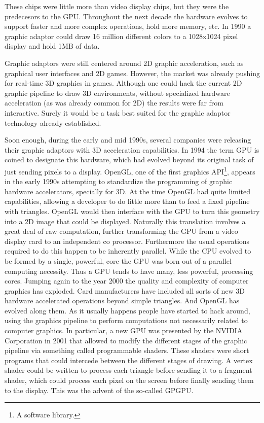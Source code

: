 \documentclass[ twoside,openright,titlepage,numbers=noenddot,%
headinclude,footinclude,cleardoublepage=empty,abstract=on,
BCOR=5mm,paper=a4,fontsize=11pt
]{scrreprt}
\newcommand{\gpu}{\gls{GPU}\xspace}
\begin{document}
These chips were little more than video display chips, but they were the predecesors to the \gpu.
Throughout the next decade the hardware evolves to support faster and more complex operations, hold more memory, etc. In 1990 a graphic adaptor could draw 16 million different colors to a 1028x1024 pixel display and hold 1MB of data.

Graphic adaptors were still centered around 2D graphic acceleration, such as graphical user interfaces and 2D games. However, the market was already pushing for real-time 3D graphics in games. Although one could hack the current 2D graphic pipeline to draw 3D environments, without specialized hardware acceleration (as was already common for 2D) the results were far from interactive. Surely it would be a task best suited for the graphic adaptor technology already established.

Soon enough, during the early and mid 1990s, several companies were releasing their graphic adaptors with 3D acceleration capabilities. In 1994 the term \gpu is coined to designate this hardware, which had evolved beyond its original task of just sending pixels to a display.
OpenGL\cite{opengl}, one of the first graphics \gls{API}\footnote{A software library.}, appears in the early 1990s attempting to standardize the programming of graphic hardware accelerators, specially for 3D.
At the time OpenGL had quite limited capabilities, allowing a developer to do little more than to feed a fixed pipeline with triangles. OpenGL would then interface with the \gpu to turn this geometry into a 2D image that could be displayed.
Naturally this translation involves a great deal of raw computation, further transforming the \gpu from a video display card to an independent co processor. Furthermore the usual operations required to do this happen to be inherently parallel. While the CPU evolved to be formed by a single, powerful, core the \gpu was born out of a parallel computing necessity. Thus a \gpu tends to have many, less powerful, processing cores.
Jumping again to the year 2000 the quality and complexity of computer graphics has exploded. Card manufacturers have included all sorts of new 3D hardware accelerated operations beyond simple triangles. And OpenGL has evolved along them. As it usually happens people have started to hack around, using the graphics pipeline to perform computations not necessarily related to computer graphics. In particular, a new \gpu was presented by the NVIDIA Corporation in 2001 that allowed to modify the different stages of the graphic pipeline via something called programmable shaders. These shaders were short programs that could intercede between the different stages of drawing. A vertex shader could be written to process each triangle before sending it to a fragment shader, which could process each pixel on the screen before finally sending them to the display. This was the advent of the so-called \gls{GPGPU}.
\end{document}
